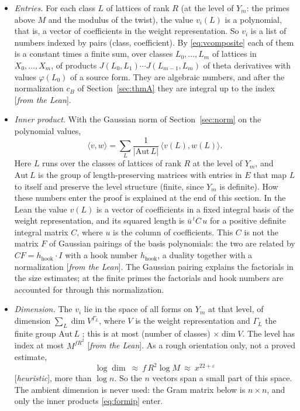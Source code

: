 \documentclass[11pt]{amsart}
\numberwithin{equation}{section}
\theoremstyle{definition}
\theoremstyle{remark}
\newcommand{\status}[1]{\textup{[\emph{#1}]}}
\begin{document}
\begin{itemize}[leftmargin=2em]
\item \emph{Entries.} For each class $L$ of lattices of rank $R$ (at the level of $Y_m$: the primes above $M$ and the modulus of the twist), the value $v_i(L)$ is a polynomial, that is, a vector of coefficients in the weight representation. So $v_i$ is a list of numbers indexed by pairs (class, coefficient). By \eqref{eq:vcomposite} each of them is a constant times a finite sum, over classes $L_0,\dots,L_m$ of lattices in $X_0,\dots,X_m$, of products $J(L_0,L_1)\cdots J(L_{m-1},L_m)$ of theta derivatives with values $\varphi(L_0)$ of a source form. They are algebraic numbers, and after the normalization $c_B$ of Section~\ref{sec:thmA} they are integral up to the index \status{from the Lean}.
\item \emph{Inner product.} With the Gaussian norm of Section~\ref{sec:norm} on the polynomial values,
\begin{equation}\label{eq:formip}
 \langle v,w\rangle=\sum_L\frac1{|\mathrm{Aut}\,L|}\,\bigl\langle v(L),w(L)\bigr\rangle .
\end{equation}
Here $L$ runs over the classes of lattices of rank $R$ at the level of $Y_m$, and $\mathrm{Aut}\,L$ is the group of length-preserving matrices with entries in $E$ that map $L$ to itself and preserve the level structure (finite, since $Y_m$ is definite). How these numbers enter the proof is explained at the end of this section. In the Lean the value $v(L)$ is a vector of coefficients in a fixed integral basis of the weight representation, and its squared length is $\bar u^{\,t}C\,u$ for a positive definite integral matrix $C$, where $u$ is the column of coefficients. This $C$ is not the matrix $F$ of Gaussian pairings of the basis polynomials: the two are related by $CF=h_{\mathrm{hook}}\cdot I$ with a hook number $h_{\mathrm{hook}}$, a duality together with a normalization \status{from the Lean}. The Gaussian pairing explains the factorials in the size estimates; at the finite primes the factorials and hook numbers are accounted for through this normalization.
\item \emph{Dimension.} The $v_i$ lie in the space of all forms on $Y_m$ at that level, of dimension $\sum_L\dim V^{\Gamma_L}$, where $V$ is the weight representation and $\Gamma_L$ the finite group $\mathrm{Aut}\,L$ \cite{gross}; this is at most (number of classes) $\times\dim V$. The level has index at most $M^{fR^2}$ \status{from the Lean}. As a rough orientation only, not a proved estimate,
\begin{equation}\label{eq:vdim}
 \log\dim\ \approx\ f\,R^2\log M\ \approx\ x^{22+\varepsilon}
\end{equation}
\status{heuristic}, more than $\log n$. So the $n$ vectors span a small part of this space. The ambient dimension is never used: the Gram matrix below is $n\times n$, and only the inner products \eqref{eq:formip} enter.
\end{itemize}
\end{document}

